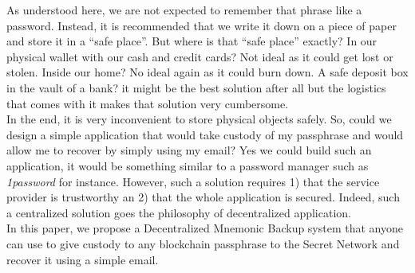 \documentclass[12pt]{article}
\begin{document}
As understood here, we are not expected to remember that phrase like a password. Instead, it is recommended that we write it down on a piece of paper and store it in a ``safe place''. But where is that ``safe place'' exactly? In our physical wallet with our cash and credit cards? Not ideal as it could get lost or stolen. Inside our home? No ideal again as it could burn down. A safe deposit box in the vault of a bank? it might be the best solution after all but the logistics that comes with it makes that solution very cumbersome. \\
 
In the end, it is very inconvenient to store physical objects safely. So, could we design a simple application that would take custody of my passphrase and would allow me to recover by simply using my email? Yes we could build such an application, it would be something similar to a password manager such as {\em 1password} \cite{1password} for instance. However, such a solution requires 1) that the service provider is trustworthy an 2) that the whole application is secured. Indeed, such a centralized solution goes the philosophy of decentralized application. \\

In this paper, we propose a Decentralized Mnemonic Backup system that anyone can use to give custody to any blockchain passphrase to the Secret Network \cite{SecretNetwork} and recover it using a simple email.  

%
%
%
%
%
%
\end{document}
